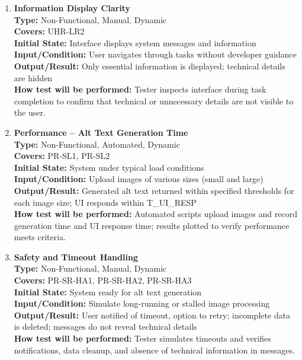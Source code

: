 \documentclass[12pt, titlepage]{article}
\begin{document}
\begin{enumerate}[label=NFR-ST \arabic*., wide=0pt, leftmargin=*]
  \item \textbf{Information Display Clarity} \\[2mm]
    \textbf{Type:} Non-Functional, Manual, Dynamic \\
    \textbf{Covers:} UHR-LR2 \\
    \textbf{Initial State:} Interface displays system messages and information \\
    \textbf{Input/Condition:} User navigates through tasks without
    developer guidance \\
    \textbf{Output/Result:} Only essential information is displayed;
    technical details are hidden \\[2mm]
    \textbf{How test will be performed:} Tester inspects interface
    during task completion to confirm that technical or unnecessary
    details are not visible to the user.

  \item \textbf{Performance – Alt Text Generation Time} \\[2mm]
    \textbf{Type:} Non-Functional, Automated, Dynamic \\
    \textbf{Covers:} PR-SL1, PR-SL2 \\
    \textbf{Initial State:} System under typical load conditions \\
    \textbf{Input/Condition:} Upload images of various sizes (small and large) \\
    \textbf{Output/Result:} Generated alt text returned within
    specified thresholds for each image size; UI responds within
    T\_UI\_RESP \\[2mm]
    \textbf{How test will be performed:} Automated scripts upload
    images and record generation time and UI response time; results
    plotted to verify performance meets criteria.

  \item \textbf{Safety and Timeout Handling} \\[2mm]
    \textbf{Type:} Non-Functional, Manual, Dynamic \\
    \textbf{Covers:} PR-SR-HA1, PR-SR-HA2, PR-SR-HA3 \\
    \textbf{Initial State:} System ready for alt text generation \\
    \textbf{Input/Condition:} Simulate long-running or stalled image
    processing \\
    \textbf{Output/Result:} User notified of timeout, option to
    retry; incomplete data is deleted; messages do not reveal
    technical details \\ [2mm]
    \textbf{How test will be performed:} Tester simulates timeouts
    and verifies notifications, data cleanup, and absence of
    technical information in messages.


\end{enumerate}
\end{document}
